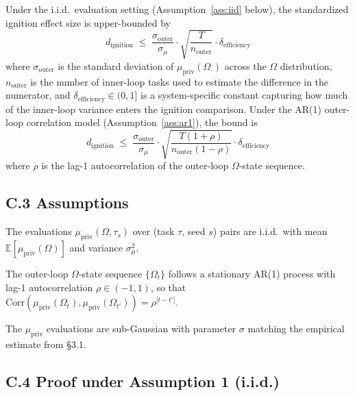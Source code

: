 \begin{theorem}
Under the i.i.d.\ evaluation setting (Assumption~\ref{ass:iid} below), the standardized ignition effect size is upper-bounded by
\[
d_{\text{ignition}} \;\le\; \frac{\sigma_{\text{outer}}}{\sigma_\mu} \cdot \sqrt{\frac{T}{n_{\text{outer}}}} \cdot \delta_{\text{efficiency}}
\]
where $\sigma_{\text{outer}}$ is the standard deviation of $\mu_{\text{priv}}(\Omega_{\cdot})$ across the $\Omega$ distribution, $n_{\text{outer}}$ is the number of inner-loop tasks used to estimate the difference in the numerator, and $\delta_{\text{efficiency}} \in (0, 1]$ is a system-specific constant capturing how much of the inner-loop variance enters the ignition comparison. Under the AR(1) outer-loop correlation model (Assumption~\ref{ass:ar1}), the bound is
\[
d_{\text{ignition}} \;\le\; \frac{\sigma_{\text{outer}}}{\sigma_\mu} \cdot \sqrt{\frac{T (1+\rho)}{n_{\text{outer}} (1-\rho)}} \cdot \delta_{\text{efficiency}}
\]
where $\rho$ is the lag-1 autocorrelation of the outer-loop $\Omega$-state sequence.
\end{theorem}

\subsection*{C.3 Assumptions}

\begin{assumption}[i.i.d.\ evaluations]\label{ass:iid}
The evaluations $\mu_{\text{priv}}(\Omega, \tau_s)$ over (task $\tau$, seed $s$) pairs are i.i.d.\ with mean $\mathbb{E}[\mu_{\text{priv}}(\Omega)]$ and variance $\sigma_\mu^2$.
\end{assumption}

\begin{assumption}\label{ass:ar1}
The outer-loop $\Omega$-state sequence $\{\Omega_t\}$ follows a stationary AR(1) process with lag-1 autocorrelation $\rho \in (-1, 1)$, so that $\text{Corr}(\mu_{\text{priv}}(\Omega_t), \mu_{\text{priv}}(\Omega_{t'})) = \rho^{|t - t'|}$.
\end{assumption}

\begin{assumption}
The $\mu_{\text{priv}}$ evaluations are sub-Gaussian with parameter $\sigma$ matching the empirical estimate from \S3.1.
\end{assumption}

\subsection*{C.4 Proof under Assumption 1 (i.i.d.)}

